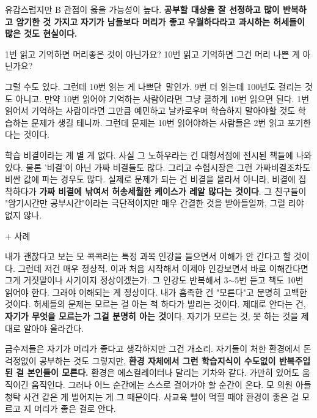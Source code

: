 유감스럽지만 B 관점이 옳을 가능성이 높다.
\textbf{공부할 대상을 잘 선정하고 많이 반복하고 암기한 것 가지고}
\textbf{자기가 남들보다 머리가 좋고 우월하다라고 과시하는 허세들이 많은 것도 현실이다.}
\vspace{5mm}

1번 읽고 기억하면 머리좋은 것이 아닌가요?
10번 읽고 기억하면 그건 머리 나쁜 게 아닌가요?
\vspace{5mm}

그럴 수도 있다. 그런데 10번 읽는 게 나쁘단 말인가.
9번 더 읽는데 100년도 걸리는 것도 아니고.
만약 10번 읽어야 기억하는 사람이라면 그냥 쿨하게 10번 읽으면 된다.
1번 읽어서 기억하는 사람이라면 그만큼 예민하고 날카로우며 학습하지 말아야할 것도 학습하는 문제가 생길 테니까.
그런데 문제는 10번 읽어야하는 사람들은 2번 읽고 포기한다는 것이다.
\vspace{5mm}

학습 비결이라는 게 별 게 없다. 사실 그 노하우라는 건 대형서점에 전시된 책들에 나와있다.
물론 '비결'이 아닌 가짜 비결들도 많다. 그리고 수험시장은 그런 가짜비결조차도 비싼 값에 파는 경우도 많다.
실제로 문제가 되는 건 비결을 몰라서 아니라, 비결에 집착하다가 \textbf{가짜 비결에 낚여서 허송세월한 케이스가 레알 많다는 것이다}.
그 친구들이 "암기시간만 공부시간"이라는 극단적이지만 매우 간결한 것을 받아들일까, 그럴 리야 없지 않나.
\vspace{5mm}

+ 사례
\vspace{5mm}

내가 괜찮다고 보는 모 콕콕러는 특정 과목 인강을 들으면서 이해가 안 간다고 할 것이다.
그런데 저건 매우 정상적. 이과 처음 시작해서 이제야 인강보면서 바로 이해간다면 그게 거짓말이나 사기이지 정상이겠는가.
그 인강도 반복해서 3$\sim$5번 듣고 책도 10번 읽어야 한다. 그래야 이해되는 게 정상이다.
내가 흡족한 건 "모른다"고 분명히 고백한 것이다. 허세들의 문제는 모르는 걸 아는 척 하다가 발리는 것이다.
제대로 안다는 건, \textbf{자기가 무엇을 모르는가 그걸 분명히 아는 것}이다.
자기가 모르는 것, 못 하는 것을 제대로 알아야 올라간다.
\vspace{5mm}

금수저들은 자기가 머리가 좋다고 생각하지만 그건 개소리.
자기들이 처한 환경에서 돈걱정없이 공부하는 것도 그렇지만, \textbf{환경 자체에서 그런 학습지식이 수도없이 반복주입된 걸 본인들이 모른다.}
환경은 에스컬레이터나 달리는 기차와 같다. 가만히 있어도 움직이긴 움직인다.
그러나 어느 순간에는 스스로 걸어가야 할 순간이 온다.
모 의원 아들 청탁 사건 같은 게 벌어지는 게 그 때문이다.
사교육 빨이 먹힐 때야 환경이 좋은 걸 모르고 지 머리가 좋은 걸로 안다.
\vspace{5mm}

